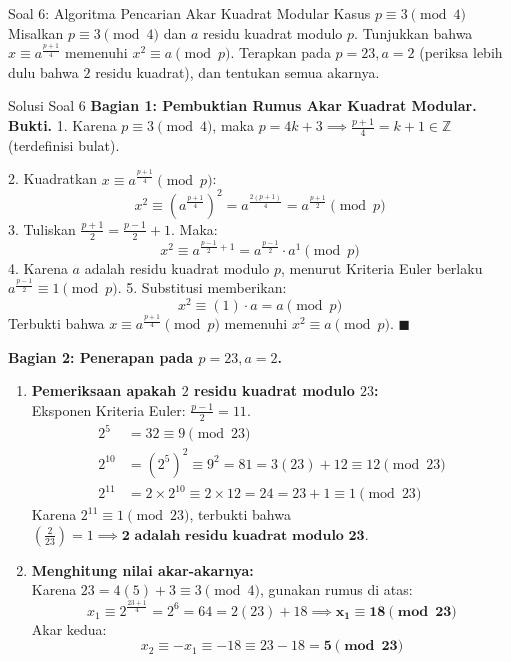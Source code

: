 \documentclass[11pt,a4paper]{article}
\newenvironment{proof}{\noindent\textbf{Bukti.}}{\hfill$\blacksquare$\vspace{0.2em}}
\begin{document}
\newpage

\begin{soalbox}{Soal 6: Algoritma Pencarian Akar Kuadrat Modular Kasus $p \equiv 3 \pmod 4$}
Misalkan $p \equiv 3 \pmod 4$ dan $a$ residu kuadrat modulo $p$. Tunjukkan bahwa $x \equiv a^{\frac{p+1}{4}}$ memenuhi $x^2 \equiv a \pmod p$. Terapkan pada $p = 23, a = 2$ (periksa lebih dulu bahwa $2$ residu kuadrat), dan tentukan semua akarnya.
\end{soalbox}

\begin{solusibox}{Solusi Soal 6}
\textbf{Bagian 1: Pembuktian Rumus Akar Kuadrat Modular.}
\begin{proof}
1. Karena $p \equiv 3 \pmod 4$, maka $p = 4k + 3 \implies \frac{p+1}{4} = k + 1 \in \mathbb{Z}$ (terdefinisi bulat).

2. Kuadratkan $x \equiv a^{\frac{p+1}{4}} \pmod p$:
\[
x^2 \equiv \left(a^{\frac{p+1}{4}}\right)^2 = a^{\frac{2(p+1)}{4}} = a^{\frac{p+1}{2}} \pmod p
\]
3. Tuliskan $\frac{p+1}{2} = \frac{p-1}{2} + 1$. Maka:
\[
x^2 \equiv a^{\frac{p-1}{2} + 1} = a^{\frac{p-1}{2}} \cdot a^1 \pmod p
\]
4. Karena $a$ adalah residu kuadrat modulo $p$, menurut Kriteria Euler berlaku $a^{\frac{p-1}{2}} \equiv 1 \pmod p$.
5. Substitusi memberikan:
\[
x^2 \equiv (1) \cdot a = a \pmod p
\]
Terbukti bahwa $x \equiv a^{\frac{p+1}{4}} \pmod p$ memenuhi $x^2 \equiv a \pmod p$.
\end{proof}

\textbf{Bagian 2: Penerapan pada $p = 23, a = 2$.}
\begin{enumerate}[leftmargin=*]
    \item \textbf{Pemeriksaan apakah $2$ residu kuadrat modulo $23$:} \\
    Eksponen Kriteria Euler: $\frac{p-1}{2} = 11$.
    \begin{align*}
    2^5 &= 32 \equiv 9 \pmod{23} \\
    2^{10} &= (2^5)^2 \equiv 9^2 = 81 = 3(23) + 12 \equiv 12 \pmod{23} \\
    2^{11} &= 2 \times 2^{10} \equiv 2 \times 12 = 24 = 23 + 1 \equiv 1 \pmod{23}
    \end{align*}
    Karena $2^{11} \equiv 1 \pmod{23}$, terbukti bahwa $\left(\frac{2}{23}\right) = 1 \implies \mathbf{2 \text{ adalah residu kuadrat modulo } 23.}$

    \item \textbf{Menghitung nilai akar-akarnya:} \\
    Karena $23 = 4(5) + 3 \equiv 3 \pmod 4$, gunakan rumus di atas:
    \[
    x_1 \equiv 2^{\frac{23+1}{4}} = 2^6 = 64 = 2(23) + 18 \implies \mathbf{x_1 \equiv 18 \pmod{23}}
    \]
    Akar kedua:
    \[
    x_2 \equiv -x_1 \equiv -18 \equiv 23 - 18 = \mathbf{5 \pmod{23}}
    \]


\end{enumerate}
\end{solusibox}
\end{document}
